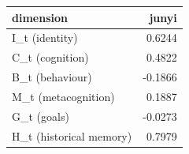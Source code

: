 \begin{tabular}{lr}
\toprule
dimension & junyi \\
\midrule
I\_t (identity) & 0.6244 \\
C\_t (cognition) & 0.4822 \\
B\_t (behaviour) & -0.1866 \\
M\_t (metacognition) & 0.1887 \\
G\_t (goals) & -0.0273 \\
H\_t (historical memory) & 0.7979 \\
\bottomrule
\end{tabular}
